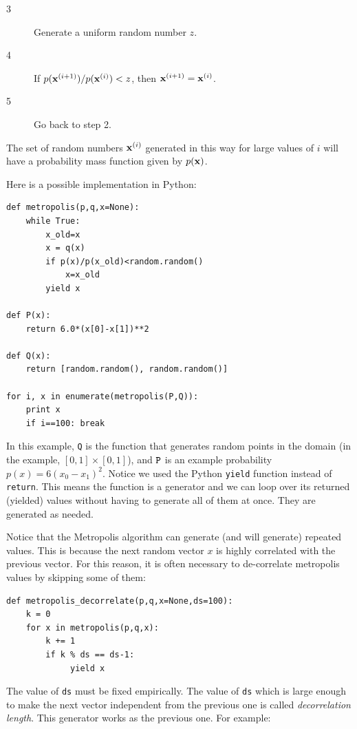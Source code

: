 \documentclass[justified,sixbynine]{tufte-book}
\def\ft{\small\tt}
\theoremstyle{plain}%
\theoremstyle{definition}
\theoremstyle{remark}
\begin{document}
\begin{fullwidth}
\begin{description}
\item[3]  Generate a uniform random number $z$.

\item[4]  If $p({\bf x}^{(i+1)})/p({\bf x}^{(i)})<z$, then ${\bf x}^{(i+1)}=%
{\bf x}^{(i)}$.

\item[5]  Go back to step 2.
\end{description}

The set of random numbers ${\bf x}^{(i)}$ generated in this way for large
values of $i$ will have a probability mass function given by $p({\bf x})$.

Here is a possible implementation in Python:
\begin{lstlisting}
def metropolis(p,q,x=None):
    while True:
        x_old=x
        x = q(x)
        if p(x)/p(x_old)<random.random()
            x=x_old
        yield x

def P(x):
    return 6.0*(x[0]-x[1])**2

def Q(x):
    return [random.random(), random.random()]

for i, x in enumerate(metropolis(P,Q)):
    print x
    if i==100: break
\end{lstlisting}

In this example, {\ft Q} is the function that generates random points in the domain (in the example, $[0,1]\times[0,1]$), and ${\ft P}$ is an example probability $p(x) = 6(x_0-x_1)^2$. Notice we used the Python {\ft yield} function instead of {\ft return}. This means the function is a generator and we can loop over its returned (yielded) values without having to generate all of them at once. They are generated as needed.


Notice that the Metropolis algorithm can generate (and will generate) repeated values. This is because the next random vector $x$ is highly correlated with the previous vector. For this reason, it is often necessary to de-correlate metropolis values by skipping some of them:

\begin{lstlisting}
def metropolis_decorrelate(p,q,x=None,ds=100):
    k = 0
    for x in metropolis(p,q,x):
        k += 1
        if k % ds == ds-1:
             yield x
\end{lstlisting}

The value of {\ft ds} must be fixed empirically. The value of {\ft ds} which is large enough to make the next vector independent from the previous one is called {\it decorrelation length}. This generator works as the previous one. For example:


\end{fullwidth}
\end{document}
